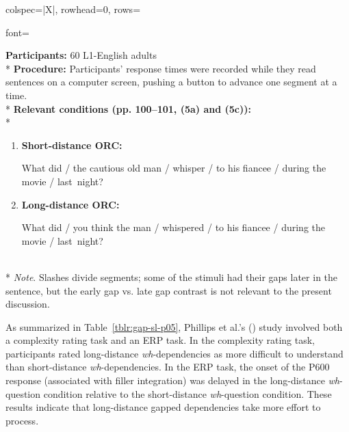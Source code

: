 \begin{longtblr}[caption={\textcite{frazier.clifton1989}: Self-paced reading task (Experiment 2)}, label={tblr:gap-sl-fc89}]{colspec={|X|}, rowhead=0, rows={font=\raggedright{}}}\hline
\textbf{Participants:} 60 L1-English adults \vspace{5pt}\\*
\textbf{Procedure:} Participants' response times were recorded while they read sentences on a computer screen, pushing a button to advance one segment at a time. \vspace{5pt}\\*
\textbf{Relevant conditions (pp. 100--101, (5a) and (5c)):} \vspace{5pt}\\*
\begin{varwidth}{\linewidth}\begin{enumerate}[\bfseries (a),itemsep=5pt] 
\item \textbf{Short-distance ORC:}\par\nobreak
What did / the cautious old man / whisper / to his fiancee / during the movie / last~night?
\item \textbf{Long-distance ORC:}\par\nobreak
What did / you think the man / whispered / to his fiancee / during the movie / last~night?
\end{enumerate}\end{varwidth}\vspace{5pt}\\*
\textit{Note}. Slashes divide segments; some of the stimuli had their gaps later in the sentence, but the early gap vs. late gap contrast is not relevant to the present discussion.
\\\hline
\end{longtblr}

As summarized in Table~\ref{tblr:gap-sl-p05}, Phillips et al.'s (\citeyear{phillips.etal2005}) study involved both a complexity rating task and an ERP task. In the complexity rating task, participants rated long-distance \textit{wh}-dependencies as more difficult to understand than short-distance \textit{wh}-dependencies. In the ERP task, the onset of the P600 response (associated with filler integration) was delayed in the long-distance \textit{wh}-question condition relative to the short-distance \textit{wh}-question condition. These results indicate that long-distance gapped dependencies take more effort to process.

